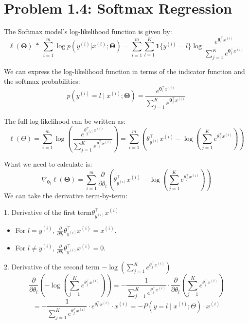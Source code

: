 \documentclass[12pt]{article}
\begin{document}
\section*{Problem 1.4: Softmax Regression}

The Softmax model's log-likelihood function is given by:
\[
\ell(\boldsymbol\Theta) \triangleq \sum_{i=1}^m \log p(y^{(i)} | x^{(i)}; \boldsymbol\Theta) = \sum_{i=1}^m \sum_{l=1}^K \mathbf{1}\{ y^{(i)} = l \} \log \frac{e^{\boldsymbol\theta_l^\top x^{(i)}}}{\sum_{j=1}^K e^{\boldsymbol\theta_j^\top x^{(i)}}}
\]

We can express the log-likelihood function in terms of the indicator function and the softmax probabilities:
\[
p(y^{(i)} = l \mid x^{(i)}; \boldsymbol\Theta) = \frac{e^{\boldsymbol\theta_l^\top x^{(i)}}}{\sum_{j=1}^K e^{\boldsymbol\theta_j^\top x^{(i)}}}
\]

The full log-likelihood can be written as:
\[
\ell(\Theta) = \sum_{i=1}^m \log \left( \frac{e^{\theta_{y^{(i)}}^\top x^{(i)}}}{\sum_{j=1}^K e^{\theta_j^\top x^{(i)}}} \right)= \sum_{i=1}^m \left( \theta_{y^{(i)}}^\top x^{(i)} - \log \left( \sum_{j=1}^K e^{\theta_j^\top x^{(i)}} \right) \right)
\]

What we need to calculate is:
\[
    \nabla_{\boldsymbol\theta_l}\ell(\boldsymbol{\Theta}) =  \sum_{i=1}^m \frac{\partial}{\partial \theta_l} \left( \theta_{y^{(i)}}^\top x^{(i)} - \log \left( \sum_{j=1}^K e^{\theta_j^\top x^{(i)}} \right) \right)
\]
We can take the derivative term-by-term:

1. Derivative of the first term\( \theta_{y^{(i)}}^\top x^{(i)} \)

\begin{itemize}
    \item For \( l = y^{(i)} \), \( \frac{\partial}{\partial \theta_l} \theta_{y^{(i)}}^\top x^{(i)} = x^{(i)} \).
    \item For \( l \neq y^{(i)} \), \( \frac{\partial}{\partial \theta_l} \theta_{y^{(i)}}^\top x^{(i)} = 0 \).
\end{itemize}

2. Derivative of the second term \( - \log \left( \sum_{j=1}^K e^{\theta_j^\top x^{(i)}} \right) \)
\[
    \frac{\partial}{\partial \theta_l} \left( - \log \left( \sum_{j=1}^K e^{\theta_j^\top x^{(i)}} \right) \right) = - \frac{1}{\sum_{j=1}^K e^{\theta_j^\top x^{(i)}}} \cdot \frac{\partial}{\partial \theta_l} \left( \sum_{j=1}^K e^{\theta_j^\top x^{(i)}} \right)
\]
\[
    = - \frac{1}{\sum_{j=1}^K e^{\theta_j^\top x^{(i)}}} \cdot  e^{\theta_l^\top x^{(i)}} \cdot x^{(i)} = - P(y = l \mid x^{(i)}; \Theta) \cdot x^{(i)}
\]
\end{document}
